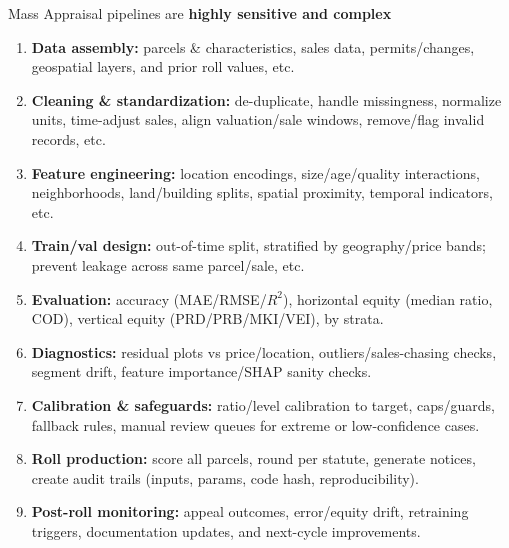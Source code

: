 \documentclass[aspectratio=169,10pt]{beamer}
\begin{document}
\begin{frame}{\frameH}
\begin{block}{ Mass Appraisal pipelines are \textbf{highly sensitive and complex}}
{ \footnotesize %
\begin{enumerate}\itemsep1pt
  \item \textbf{Data assembly:} parcels \& characteristics, sales data, permits/changes, geospatial layers, and prior roll values, etc.
  \item \textbf{Cleaning \& standardization:} de-duplicate, handle missingness, normalize units, time-adjust sales, align valuation/sale windows, remove/flag invalid records, etc.
  \item \textbf{Feature engineering:} location encodings, size/age/quality interactions, neighborhoods, land/building splits, spatial proximity, temporal indicators, etc.
  \item \textbf{Train/val design:} out-of-time split, stratified by geography/price bands; prevent leakage across same parcel/sale, etc.
  \item \textbf{Evaluation:} accuracy (MAE/RMSE/$R^2$), horizontal equity (median ratio, COD), vertical equity (PRD/PRB/MKI/VEI), by strata.
  \item \textbf{Diagnostics:} residual plots vs price/location, outliers/sales-chasing checks, segment drift, feature importance/SHAP sanity checks.
  \item \textbf{Calibration \& safeguards:} ratio/level calibration to target, caps/guards, fallback rules, manual review queues for extreme or low-confidence cases.
  \item \textbf{Roll production:} score all parcels, round per statute, generate notices, create audit trails (inputs, params, code hash, reproducibility).
  \item \textbf{Post-roll monitoring:} appeal outcomes, error/equity drift, retraining triggers, documentation updates, and next-cycle improvements.
\end{enumerate}
}

\end{block}
    
\end{frame}

\newcommand{\frameG}{Implementation goal: easy-to-deploy solution}
\end{document}
